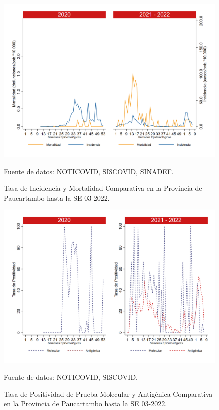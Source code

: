\documentclass[12pt,a4paper,openany]{book}
\begin{document}
		\begin{figure}[h]
			\caption{Tasa de Incidencia y Mortalidad Comparativa en la Provincia de Paucartambo hasta la SE 03-2022.}\label{fig:inc_mort_paucartam}
			\begin{center}
				\includegraphics[width=0.7\linewidth]{../figuras/incidencia_mortalidad_20_21_11.png}
			\end{center}
			{\footnotesize {Fuente de datos: NOTICOVID, SISCOVID, SINADEF.}}
		\end{figure}
		
		\begin{figure}[h]
			\caption{Tasa de Positividad de Prueba Molecular y Antigénica Comparativa en la Provincia de Paucartambo hasta la SE 03-2022.}\label{fig:positividad_paucartam}
			\begin{center}
				\includegraphics[width=0.7\linewidth]{../figuras/positividad_20_21_11.png}
			\end{center}
			{\footnotesize {Fuente de datos: NOTICOVID, SISCOVID.}}
		\end{figure}
		
\end{document}
